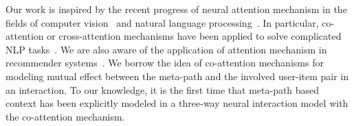 Our work is inspired by the recent progress of neural attention mechanism in the fields of computer vision~\cite{xu2015show} and natural language processing~\cite{phan2017neupl}. In particular, co-attention or cross-attention mechanisms have been applied to solve complicated NLP tasks~\cite{hao2017end,xiong2016dynamic}.
We are also aware of the application of attention mechanism in recommender systems~\cite{chen2017attentive,wang2017dynamic,xiao2017attentional}.
We borrow the idea of co-attention mechanisms for modeling mutual effect between the meta-path and the involved user-item pair in an interaction.
To our knowledge, it is the first time that meta-path based context has been explicitly modeled in a three-way neural interaction model with the co-attention mechanism.





